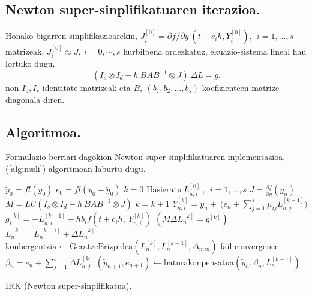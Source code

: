 \subsection*{Newton super-sinplifikatuaren iterazioa.}

Honako bigarren sinplifikazioarekin, $J_i^{[0]}=\partial f / \partial y \ (t+c_ih, Y_i^{[0]}), \ \  i=1,\dots,s$ matrizeak,  $J_i^{[0]} \approx J, \ i=0,\cdots,s$ hurbilpena ordezkatuz, ekuazio-sistema lineal hau lortuko dugu,
\begin{equation}
\label{eq:nsseq2}
(I_s \otimes I_d - h \ BAB^{-1} \otimes J) \ \Delta L = g. 
\end{equation}
non $I_d, I_s$ identitate matrizeak eta $B, \ (b_1,b_2,\dots,b_s)$ koefizienteen matrize diagonala diren.  

\subsection*{Algoritmoa.}

Formulazio berriari dagokion Newton super-sinplifikatuaren inplementazioa, (\ref{alg:nssli}) algoritmoan laburtu dugu.

\begin{algorithm}[H]
 \BlankLine
  $\tilde{y}_0=fl(y_0)$\;
  $e_0=fl(y_0-\tilde{y}_0)$\;
  {
   \BlankLine
   $k=0$\;
   $\text{Hasieratu} \ L_{n,i}^{[0]} \ , \ \ i=1,\dots,s $\;
   \BlankLine
   $J=\frac{\partial f}{\partial y}(y_n) $\; 
   $M=LU(I_s \otimes I_d - h \ BAB^{-1} \otimes J)$\;
   \BlankLine
   {
    \BlankLine 
    $k=k+1$\;
    $Y_{n,i}^{[k]}=y_{n} + \ \big(e_n+\sum\limits_{j=1}^{s} \mu_{ij} L_{n,j}^{[k-1]}\big)  $\;
    $g_i^{[k]}=-L_{n,i}^{[k-1]}+h b_i f(t+c_ih,\ Y_{n,i}^{[k]})$\;
     $(M \Delta L_n^{[k]}=g^{[k]})$\;
    $L_n^{[k]}=L_n^{[k-1]}+\Delta L_n^{[k]}$\;
    $\text{konbergentzia} \leftarrow \text{GeratzeErizpidea}(L_n^{[k]},L_n^{[k-1]},\Delta_{min}) $\;
   }
   \BlankLine
   {
    {$\text{fail convergence}$\;}
   }
   $\beta_{n}={e}_{n} + \sum\limits_{j=1}^{s}\Delta L_{n,j}^{[k]}$\;
   $(\tilde y_{n+1}, e_{n+1})\leftarrow \text{baturakonpensatua}(\tilde y_{n},\beta_{n},L_{n}^{[k-1]})$\;
 }
 \caption{IRK (Newton super-sinplifikatua).}
 \label{alg:nssli}
\end{algorithm}


